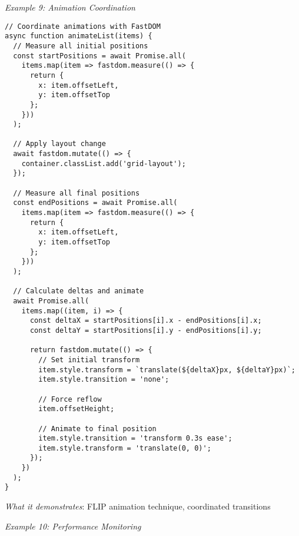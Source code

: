 \documentclass[11pt]{article}
\begin{document}
\emph{Example 9: Animation Coordination}

\begin{verbatim}
// Coordinate animations with FastDOM
async function animateList(items) {
  // Measure all initial positions
  const startPositions = await Promise.all(
    items.map(item => fastdom.measure(() => {
      return {
        x: item.offsetLeft,
        y: item.offsetTop
      };
    }))
  );
  
  // Apply layout change
  await fastdom.mutate(() => {
    container.classList.add('grid-layout');
  });
  
  // Measure all final positions
  const endPositions = await Promise.all(
    items.map(item => fastdom.measure(() => {
      return {
        x: item.offsetLeft,
        y: item.offsetTop
      };
    }))
  );
  
  // Calculate deltas and animate
  await Promise.all(
    items.map((item, i) => {
      const deltaX = startPositions[i].x - endPositions[i].x;
      const deltaY = startPositions[i].y - endPositions[i].y;
      
      return fastdom.mutate(() => {
        // Set initial transform
        item.style.transform = `translate(${deltaX}px, ${deltaY}px)`;
        item.style.transition = 'none';
        
        // Force reflow
        item.offsetHeight;
        
        // Animate to final position
        item.style.transition = 'transform 0.3s ease';
        item.style.transform = 'translate(0, 0)';
      });
    })
  );
}
\end{verbatim}

\emph{What it demonstrates}: FLIP animation technique, coordinated transitions

\emph{Example 10: Performance Monitoring}
\end{document}
